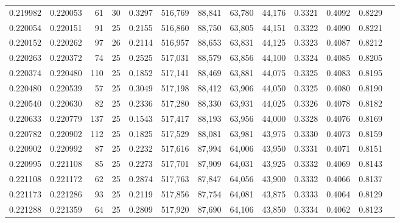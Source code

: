 \begin{tabular}{rrrrrrrrrrrrr}
0.219982 & 0.220053 &    61 &  30 &                                     0.3297 & 516,769 &  88,841 &  63,780 &  44,176 & 0.3321 & 0.4092 & 0.8229 \\
0.220054 & 0.220151 &    91 &  25 &                                     0.2155 & 516,860 &  88,750 &  63,805 &  44,151 & 0.3322 & 0.4090 & 0.8221 \\
0.220152 & 0.220262 &    97 &  26 &                                     0.2114 & 516,957 &  88,653 &  63,831 &  44,125 & 0.3323 & 0.4087 & 0.8212 \\
0.220263 & 0.220372 &    74 &  25 &                                     0.2525 & 517,031 &  88,579 &  63,856 &  44,100 & 0.3324 & 0.4085 & 0.8205 \\
0.220374 & 0.220480 &   110 &  25 &                                     0.1852 & 517,141 &  88,469 &  63,881 &  44,075 & 0.3325 & 0.4083 & 0.8195 \\
0.220480 & 0.220539 &    57 &  25 &                                     0.3049 & 517,198 &  88,412 &  63,906 &  44,050 & 0.3325 & 0.4080 & 0.8190 \\
0.220540 & 0.220630 &    82 &  25 &                                     0.2336 & 517,280 &  88,330 &  63,931 &  44,025 & 0.3326 & 0.4078 & 0.8182 \\
0.220633 & 0.220779 &   137 &  25 &                                     0.1543 & 517,417 &  88,193 &  63,956 &  44,000 & 0.3328 & 0.4076 & 0.8169 \\
0.220782 & 0.220902 &   112 &  25 &                                     0.1825 & 517,529 &  88,081 &  63,981 &  43,975 & 0.3330 & 0.4073 & 0.8159 \\
0.220902 & 0.220992 &    87 &  25 &                                     0.2232 & 517,616 &  87,994 &  64,006 &  43,950 & 0.3331 & 0.4071 & 0.8151 \\
0.220995 & 0.221108 &    85 &  25 &                                     0.2273 & 517,701 &  87,909 &  64,031 &  43,925 & 0.3332 & 0.4069 & 0.8143 \\
0.221108 & 0.221172 &    62 &  25 &                                     0.2874 & 517,763 &  87,847 &  64,056 &  43,900 & 0.3332 & 0.4066 & 0.8137 \\
0.221173 & 0.221286 &    93 &  25 &                                     0.2119 & 517,856 &  87,754 &  64,081 &  43,875 & 0.3333 & 0.4064 & 0.8129 \\
0.221288 & 0.221359 &    64 &  25 &                                     0.2809 & 517,920 &  87,690 &  64,106 &  43,850 & 0.3334 & 0.4062 & 0.8123 \\

\end{tabular}

